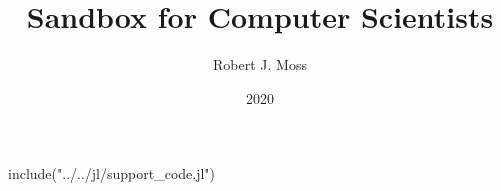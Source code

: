 \documentclass[fullbook]{tufte_algorithms_book}
\title{Sandbox for Computer Scientists}
\author[Moss]{Robert J. Moss}
\date{2020}
\begin{document}
\begin{jlcode}
	include("../../jl/support_code.jl")
\end{jlcode}


\end{document}
